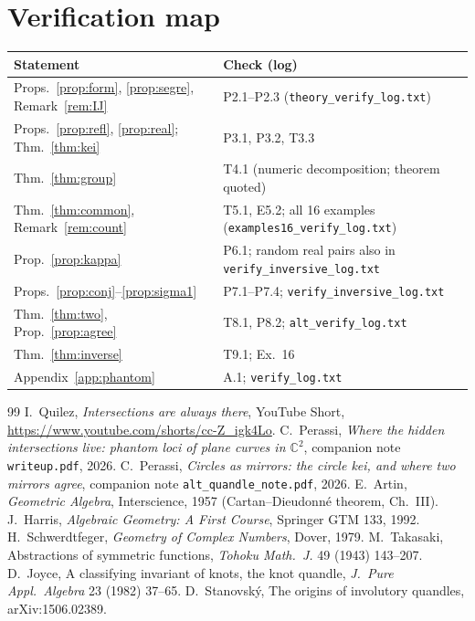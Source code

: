 \documentclass[11pt]{article}
\theoremstyle{definition}\newtheorem{definition}[theorem]{Definition}\newtheorem{remark}[theorem]{Remark}\newtheorem{example}[theorem]{Example}
\newcommand{\C}{\mathbb{C}}\newcommand{\R}{\mathbb{R}}\newcommand{\PP}{\mathbb{P}}
\begin{document}
\section{Verification map}\label{app:ver}
\begin{center}\small\begin{tabular}{ll}\toprule
Statement & Check (log) \\\midrule
Props.~\ref{prop:form}, \ref{prop:segre}, Remark~\ref{rem:IJ} & \textsf{P2.1--P2.3} (\texttt{theory\_verify\_log.txt})\\
Props.~\ref{prop:refl}, \ref{prop:real}; Thm.~\ref{thm:kei} & \textsf{P3.1, P3.2, T3.3}\\
Thm.~\ref{thm:group} & \textsf{T4.1} (numeric decomposition; theorem quoted)\\
Thm.~\ref{thm:common}, Remark~\ref{rem:count} & \textsf{T5.1, E5.2}; all 16 examples (\texttt{examples16\_verify\_log.txt})\\
Prop.~\ref{prop:kappa} & \textsf{P6.1}; random real pairs also in \texttt{verify\_inversive\_log.txt}\\
Props.~\ref{prop:conj}--\ref{prop:sigma1} & \textsf{P7.1--P7.4}; \texttt{verify\_inversive\_log.txt}\\
Thm.~\ref{thm:two}, Prop.~\ref{prop:agree} & \textsf{T8.1, P8.2}; \texttt{alt\_verify\_log.txt}\\
Thm.~\ref{thm:inverse} & \textsf{T9.1}; Ex.~16\\
Appendix~\ref{app:phantom} & \textsf{A.1}; \texttt{verify\_log.txt}\\\bottomrule
\end{tabular}\end{center}

\begin{thebibliography}{99}\small
{} I.~Quilez, \emph{Intersections are always there}, YouTube Short, \url{https://www.youtube.com/shorts/cc-Z_igk4Lo}.
 C.~Perassi, \emph{Where the hidden intersections live: phantom loci of plane curves in $\C^2$}, companion note \texttt{writeup.pdf}, 2026.
 C.~Perassi, \emph{Circles as mirrors: the circle kei, and where two mirrors agree}, companion note \texttt{alt\_quandle\_note.pdf}, 2026.
 E.~Artin, \emph{Geometric Algebra}, Interscience, 1957 (Cartan--Dieudonné theorem, Ch.~III).
 J.~Harris, \emph{Algebraic Geometry: A First Course}, Springer GTM 133, 1992.
 H.~Schwerdtfeger, \emph{Geometry of Complex Numbers}, Dover, 1979.
 M.~Takasaki, Abstractions of symmetric functions, \emph{Tohoku Math.\ J.} 49 (1943) 143--207.
 D.~Joyce, A classifying invariant of knots, the knot quandle, \emph{J.\ Pure Appl.\ Algebra} 23 (1982) 37--65.
 D.~Stanovsk\'y, The origins of involutory quandles, arXiv:1506.02389.
\end{thebibliography}
\end{document}
